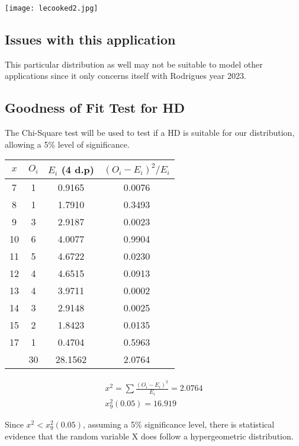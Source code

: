 \documentclass{article}
\begin{document}
\begin{center}
  \texttt{[image: lecooked2.jpg]}
\end{center}

\subsection{Issues with this application}
This particular distribution as well may not be suitable to model
other applications since it only concerns itself with Rodrigues 
year 2023.

\subsection{Goodness of Fit Test for HD}
The Chi-Square test will be used to test if a HD is suitable for
our distribution, allowing a 5\% level of significance.

\begin{center}
  \begin{tabular}{|c|c|c|c|}
  \hline
    $ x $ & $ O_i $ & $ E_i $ (4 d.p) & $(O_i - E_i)^2 / E_i$ \\
    \hline
    \hline
    7  & 1 & 0.9165 & 0.0076 \\
    8  & 1 & 1.7910 & 0.3493 \\
    9  & 3 & 2.9187 & 0.0023 \\
    10 & 6 & 4.0077 & 0.9904 \\
    11 & 5 & 4.6722 & 0.0230 \\
    12 & 4 & 4.6515 & 0.0913 \\
    13 & 4 & 3.9711 & 0.0002 \\
    14 & 3 & 2.9148 & 0.0025 \\
    15 & 2 & 1.8423 & 0.0135 \\
    17 & 1 & 0.4704 & 0.5963 \\
    \hline
    \hline
       & 30& 28.1562& 2.0764 \\
    \hline
  \end{tabular}
\end{center}

\begin{gather*}
  x^2 = \sum \frac{(O_i - E_i)^2}{E_i} = 2.0764 \\[5pt]
  x^2_9(0.05) = 16.919
\end{gather*}

Since $ x^2 < x^2_9(0.05) $,
assuming a 5\% significance level,
there is statistical evidence that
the random variable X does 
follow a hypergeometric distribution.
\end{document}
